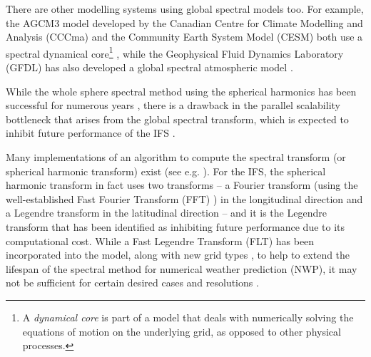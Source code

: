 There are other modelling systems using global spectral models too. For example, the AGCM3 model developed by the Canadian Centre for Climate Modelling and Analysis (CCCma) and the Community Earth System Model (CESM) both use a spectral dynamical core\footnote{A \textit{dynamical core} is part of a model that deals with numerically solving the equations of motion on the underlying grid, as opposed to other physical processes.} \cite{hurrell2013community, scinocca2008cccma}, while the Geophysical Fluid Dynamics Laboratory (GFDL) has also developed a global spectral atmospheric model \cite{gordon1982description}.

While the whole sphere spectral method using the spherical harmonics has been successful for numerous years \cite{williamson2007evolution}, there is a drawback in the parallel scalability bottleneck that arises from the global spectral transform, which is expected to inhibit future performance of the IFS \cite{ecmwf2020scalability, wedi2013fast}. 

Many implementations of an algorithm to compute the spectral transform (or spherical harmonic transform) exist (see e.g. \cite{slevinsky2019fast, suda2002fast}). For the IFS, the spherical harmonic transform in fact uses two transforms -- a Fourier transform (using the well-established Fast Fourier Transform (FFT) \cite{cooley1965algorithm}) in the longitudinal direction and a Legendre transform in the latitudinal direction -- and it is the Legendre transform that has been identified as inhibiting future performance due to its computational cost. While a Fast Legendre Transform (FLT) \cite{wedi2013fast} has been incorporated into the model, along with new grid types \cite{malardel2016new}, to help to extend the lifespan of the spectral method for numerical weather prediction (NWP), it may not be sufficient for certain desired cases and resolutions \cite{wedi2014increasing}. 

